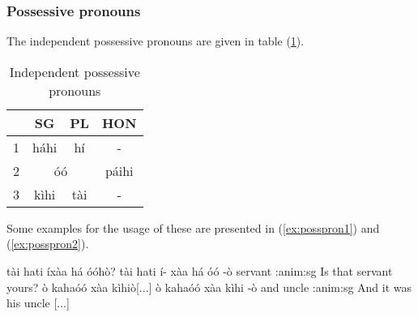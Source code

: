 \documentclass[a4paper, 12pt, oneside]{memoir}
\begin{document}
\subsubsection{Possessive pronouns}
The independent possessive pronouns are given in table (\ref{t:posspron}).
\begin{table}[H]
\begin{centering}
\begin{tabular}{@{}lccc@{}}
\toprule
\multicolumn{1}{c}{} & SG         & PL        & HON   \\ \midrule
1                    & háhi       & hí        & -     \\
2                    & \multicolumn{2}{c}{óó} & páihi \\
3                    & kìhi       & tài       & -     \\ \bottomrule
\end{tabular}
\caption{Independent possessive pronouns}
\label{t:posspron}
\end{centering}
\end{table}
Some examples for the usage of these are presented in (\ref{ex:posspron1}) and (\ref{ex:posspron2}).
\begin{examples}
\ex \label{ex:posspron1}
\words tài hati íxàa há óóhò?
\bits tài hati í- xàa há óó -ò
\gloss {\Demprox} servant {\Qu} {\Cop} {\Cngr} {\Ssposs} {\Cl}:anim:sg
\tr Is that servant yours?
\ex \label{ex:posspron2}
\words ò kahaóó xàa kìhiò[...]
\bits ò kahaóó xàa kìhi -ò
\gloss and uncle {\Cop} {\Tsposs} {\Cl}:anim:sg
\tr And it was his uncle [...]
\end{examples}
\end{document}
